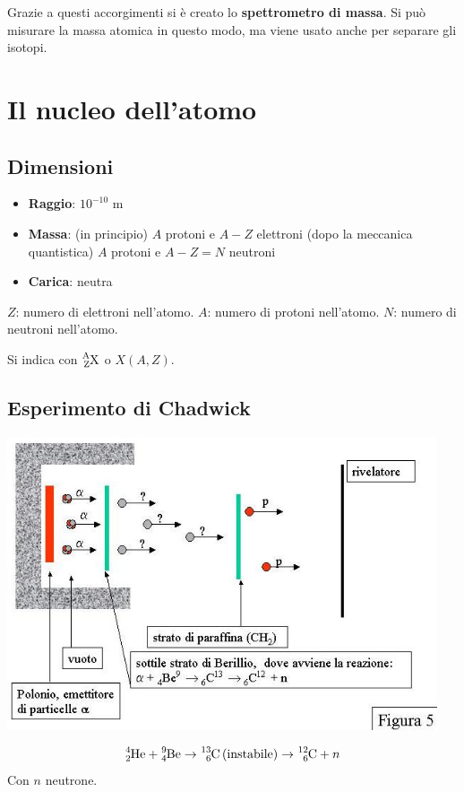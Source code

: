 \documentclass[a4paper,11pt,twoside,openany]{book}
\theoremstyle{definition}
\theoremstyle{plain}
\theoremstyle{plain}
\theoremstyle{definition}
\begin{document}
Grazie a questi accorgimenti si è creato lo \textbf{spettrometro di massa}. Si può misurare la massa atomica in questo modo, ma viene usato anche per separare gli isotopi.

\chapter{Il nucleo dell'atomo} %
\section{Dimensioni}
\begin{itemize}
\item \textbf{Raggio}: $10^{-10}$ m
\item \textbf{Massa}: (in principio) $A$ protoni e $A-Z$ elettroni (dopo la meccanica quantistica) $A$ protoni e $A-Z=N$ neutroni
\item \textbf{Carica}: neutra
\end{itemize}
$Z$: numero di elettroni nell'atomo. $A$: numero di protoni nell'atomo. $N$: numero di neutroni nell'atomo.

Si indica con $\ce{_Z^AX}$ o $X\left(A,Z\right)$.

\section{Esperimento di Chadwick} %

\begin{center}
\includegraphics[width=5in]{immagini/chandwick.jpg} %
\end{center}

\begin{equation}\begin{split}
\ce{^4_2He}+\ce{^9_4Be}\rightarrow \ce{^{13}_6C} \left(\textrm{instabile}\right)\rightarrow \ce{^{12}_6C}+n
\end{split}\end{equation}
Con $n$ neutrone.
\end{document}
